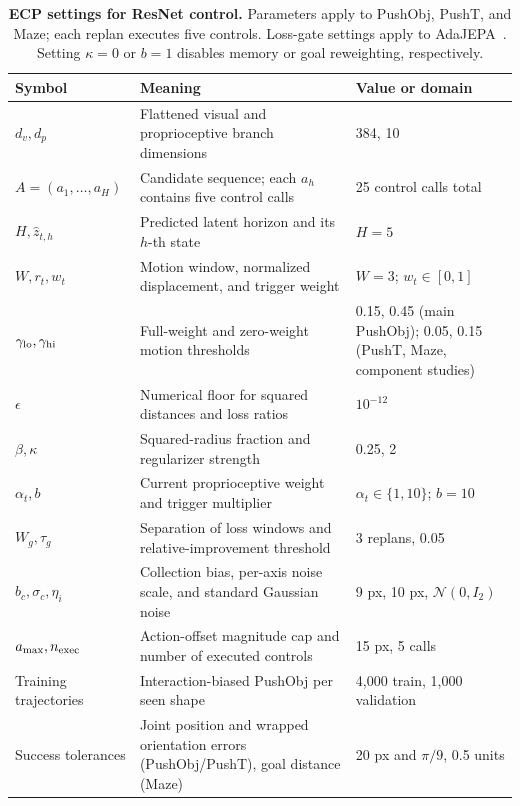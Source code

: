 \begin{table}[t]
\centering
\caption{\textbf{ECP settings for ResNet control.} Parameters apply to PushObj, PushT, and Maze; each replan executes five controls. Loss-gate settings apply to AdaJEPA~\cite{wang2026adajepa}. Setting $\kappa=0$ or $b=1$ disables memory or goal reweighting, respectively.}
\label{tab:parameters}
\small
\begin{tabular}{p{}p{}p{}}
\toprule
Symbol & Meaning & Value or domain\\
\midrule
$d_v,d_p$ & Flattened visual and proprioceptive branch dimensions & 384, 10\\
$A=(a_1,\ldots,a_H)$ & Candidate sequence; each $a_h$ contains five control calls & 25 control calls total\\
$H,\hat z_{t,h}$ & Predicted latent horizon and its $h$-th state & $H=5$\\
$W,r_t,w_t$ & Motion window, normalized displacement, and trigger weight & $W=3$; $w_t\in[0,1]$\\
$\gamma_{\rm lo},\gamma_{\rm hi}$ & Full-weight and zero-weight motion thresholds & 0.15, 0.45 (main PushObj); 0.05, 0.15 (PushT, Maze, component studies)\\
$\epsilon$ & Numerical floor for squared distances and loss ratios & $10^{-12}$\\
$\beta,\kappa$ & Squared-radius fraction and regularizer strength & 0.25, 2\\
$\alpha_t,b$ & Current proprioceptive weight and trigger multiplier & $\alpha_t\in\{1,10\}$; $b=10$\\
$W_g,\tau_g$ & Separation of loss windows and relative-improvement threshold & 3 replans, 0.05\\
$b_c,\sigma_c,\eta_i$ & Collection bias, per-axis noise scale, and standard Gaussian noise & 9 px, 10 px, $\mathcal N(0,I_2)$\\
$a_{\max},n_{\rm exec}$ & Action-offset magnitude cap and number of executed controls & 15 px, 5 calls\\
Training trajectories & Interaction-biased PushObj per seen shape & 4,000 train, 1,000 validation\\
Success tolerances & Joint position and wrapped orientation errors (PushObj/PushT), goal distance (Maze) & 20 px and $\pi/9$, 0.5 units\\
\bottomrule
\end{tabular}
\end{table}

